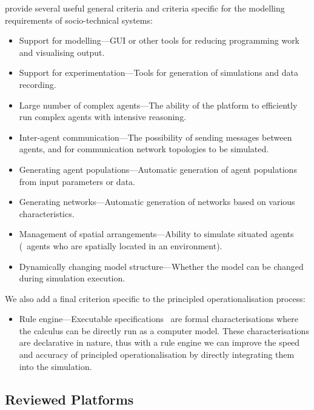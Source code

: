 \citet{Tobias2004} provide several useful general criteria and criteria specific for the modelling requirements of socio-technical systems:

\begin{itemize}
\item Support for modelling---\ac{GUI} or other tools for reducing programming work and visualising output.
\item Support for experimentation---Tools for generation of simulations and data recording.
\item Large number of complex agents---The ability of the platform to efficiently run complex agents with intensive reasoning.
\item Inter-agent communication---The possibility of sending messages between agents, and for communication network topologies to be simulated.
\item Generating agent populations---Automatic generation of agent populations from input parameters or data.
\item Generating networks---Automatic generation of networks based on various characteristics.
\item Management of spatial arrangements---Ability to simulate situated agents (\ie\ agents who are spatially located in an environment).
\item Dynamically changing model structure---Whether the model can be changed during simulation execution.
\end{itemize}

We also add a final criterion specific to the principled operationalisation process:
\begin{itemize}
\item Rule engine---Executable specifications~\citep{Artikis2010} are formal characterisations where the calculus can be directly run as a computer model. These characterisations are declarative in nature, thus with a rule engine we can improve the speed and accuracy of principled operationalisation by directly integrating them into the simulation.
\end{itemize}

\subsection{Reviewed Platforms}

